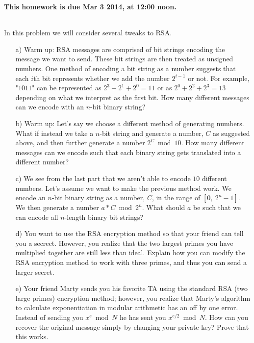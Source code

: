 \documentclass[]{article}
\begin{document}
\maketitle
{}
\vspace{0.5em}
{\Large{\textbf{This homework is due Mar 3 2014, at 12:00 noon.}}}



\begin{qunlist}
  
\\    %
In this problem we will consider several tweaks to RSA.
\begin{itemize}
\qpart
\item [a)] Warm up: RSA messages are comprised of bit strings encoding the message we want to send. These bit strings are then treated as unsigned numbers. One method of encoding a bit string as a number suggests that each $i$th bit represents whether we add the number $2^{i-1}$ or not. For example, "$1011$" can be represented as $2^3 + 2^1 + 2^0 = 11$ or as $2^0 + 2^2 + 2^3 = 13$ depending on what we interpret as the first bit. How many different messages can we encode with an $n$-bit binary string?
\qpart
\item [b)] Warm up: Let's say we choose a different method of generating numbers. What if instead we take a $n$-bit string and generate a number, $C$ as suggested above, and then further generate a number $2^C \bmod 10$. How many different messages can we encode such that each binary string gets translated into a different number?
\qpart
\item [c)] We see from the last part that we aren't able to encode $10$ different numbers. Let's assume we want to make the previous method work. We encode an $n$-bit binary string as a number, $C$, in the range of $[0, \ 2^n -1]$. We then generate a number $a*C \bmod {2^n}$. What should $a$ be such that we can encode all $n$-length binary bit strings?
\qpart
\item [d)] You want to use the RSA encryption method so that your friend can tell you a secrect. However, you realize that the two largest primes you have multiplied together are still less than ideal. Explain how you can modify the RSA encryption method to work with three primes, and thus you can send a larger secret.
\qpart
\item [e)] Your friend Marty sends you his favorite TA using the standard RSA (two large primes) encryption method; however, you realize that Marty's algorithm to calculate exponentiation in modular arithmetic has an off by one error. Instead of sending you $x^e \bmod{N}$ he has sent you $x^{e/2} \bmod{N}$. How can you recover the original message simply by changing your private key? Prove that this works.
\end{itemize}



\end{qunlist}
\end{document}
